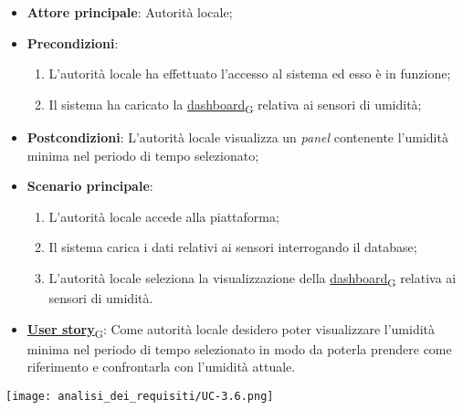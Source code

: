 \begin{itemize}
	\item \textbf{Attore principale}: Autorità locale;
	\item \textbf{Precondizioni}:
	      \begin{enumerate}
		      \item L'autorità locale ha effettuato l'accesso al sistema ed esso è in funzione;
		      \item Il sistema ha caricato la \href{https://7last.github.io/docs/rtb/documentazione-interna/glossario\#dashboard}{dashboard\textsubscript{G}} relativa ai sensori di umidità;
	      \end{enumerate}
	\item \textbf{Postcondizioni}: L'autorità locale visualizza un \textit{panel} contenente l'umidità minima nel periodo di tempo selezionato;
	\item \textbf{Scenario principale}:
	      \begin{enumerate}
		      \item L'autorità locale accede alla piattaforma;
		      \item Il sistema carica i dati relativi ai sensori interrogando il database;
		      \item L'autorità locale seleziona la visualizzazione della \href{https://7last.github.io/docs/rtb/documentazione-interna/glossario\#dashboard}{dashboard\textsubscript{G}} relativa ai sensori di umidità.
	      \end{enumerate}
	\item \href{https://7last.github.io/docs/rtb/documentazione-interna/glossario\#user-story}{\textbf{User story}\textsubscript{G}}:
	      Come autorità locale desidero poter visualizzare l'umidità minima nel periodo di tempo selezionato
	      in modo da poterla prendere come riferimento e confrontarla con l'umidità attuale.
\end{itemize}
\begin{center}
	\texttt{[image: analisi\_dei\_requisiti/UC-3.6.png]}
\end{center}


